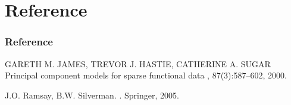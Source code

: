 \documentclass{beamer}
\begin{document}
\appendix
\section{Reference}
\begin{frame}
  \frametitle<presentation>{Reference}
    
  \begin{thebibliography}{10}
  	\beamertemplatearticlebibitems
	GARETH M. JAMES, TREVOR J. HASTIE, CATHERINE A. SUGAR
	\newblock Principal component models for sparse functional data
	, 87(3):587--602,
	2000.
    
  \beamertemplatebookbibitems
		J.O. Ramsay, B.W. Silverman.
		.
		\newblock Springer, 2005.

  \end{thebibliography}
\end{frame}


%
%    
%    
%
% 
%    
%
\end{document}
